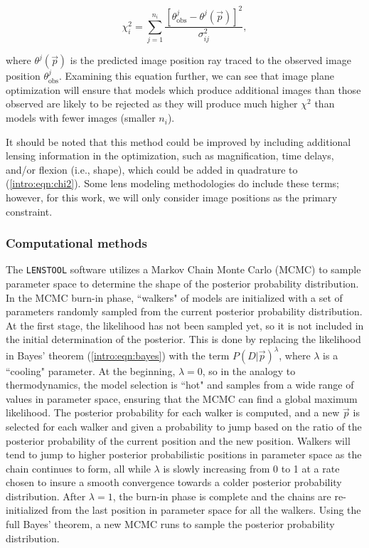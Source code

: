 \begin{equation}
\chi^2_i = \sum_{j=1}^{n_i} \frac{[\theta_\mathrm{obs}^j - \theta^j (\vec{p})]^2}{\sigma_{ij}^2},
\label{intro:eqn:chi2}
\end{equation}

\noindent where $\theta^j (\vec{p})$ is the predicted image position ray traced to the observed image position $\theta_\mathrm{obs}^j$. Examining this equation further, we can see that image plane optimization will ensure that models which produce additional images than those observed are likely to be rejected as they will produce much higher $\chi^2$ than models with fewer images (smaller $n_i$).

It should be noted that this method could be improved by including additional lensing information in the optimization, such as magnification, time delays, and/or flexion (i.e., shape), which could be added in quadrature to (\ref{intro:eqn:chi2}). Some lens modeling methodologies do include these terms; however, for this work, we will only consider image positions as the primary constraint.

\subsubsection{Computational methods}

The \texttt{LENSTOOL} software utilizes a Markov Chain Monte Carlo (MCMC) to sample parameter space to determine the shape of the posterior probability distribution. In the MCMC burn-in phase, ``walkers" of models are initialized with a set of parameters randomly sampled from the current posterior probability distribution. At the first stage, the likelihood has not been sampled yet, so it is not included in the initial determination of the posterior. This is done by replacing the likelihood in Bayes' theorem (\ref{intro:eqn:bayes}) with the term $P(D | \vec{p} )^\lambda$, where $\lambda$ is a ``cooling" parameter. At the beginning, $\lambda=0$, so in the analogy to thermodynamics, the model selection is ``hot" and samples from a wide range of values in parameter space, ensuring that the MCMC can find a global maximum likelihood. The posterior probability for each walker is computed, and a new $\vec{p}$ is selected for each walker and given a probability to jump based on the ratio of the posterior probability of the current position and the new position. Walkers will tend to jump to higher posterior probabilistic positions in parameter space as the chain continues to form, all while $\lambda$ is slowly increasing from 0 to 1 at a rate chosen to insure a smooth convergence towards a colder posterior probability distribution. After $\lambda=1$, the burn-in phase is complete and the chains are re-initialized from the last position in parameter space for all the walkers. Using the full Bayes' theorem, a new MCMC runs to sample the posterior probability distribution.

